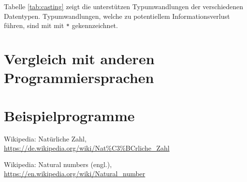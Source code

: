 \documentclass[10pt, a4paper, twocolumn]{article} %
\begin{document}
Tabelle \ref{tab:casting} zeigt die unterstützen Typumwandlungen der verschiedenen Datentypen.
Typumwandlungen, welche zu potentiellem Informationsverlust führen, sind mit mit \texttt{*} gekennzeichnet.
\begin{table}[h]
    \tiny
    \centering
    \caption{Casting zwischen Datentypen}
    \label{tab:casting}
\end{table}


\section{Vergleich mit anderen Programmiersprachen}

\section{Beispielprogramme}



\begin{thebibliography}{9}
	Wikipedia: Natürliche Zahl,
	\url{https://de.wikipedia.org/wiki/Nat\%C3\%BCrliche_Zahl}

    Wikipedia: Natural numbers (engl.),
    \url{https://en.wikipedia.org/wiki/Natural_number}


\end{thebibliography}
\end{document}
